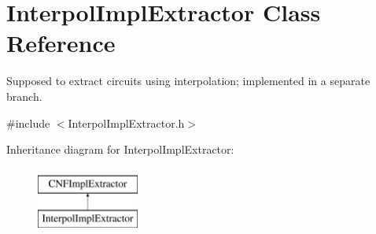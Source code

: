 \hypertarget{classInterpolImplExtractor}{\section{Interpol\-Impl\-Extractor Class Reference}
\label{classInterpolImplExtractor}
}


Supposed to extract circuits using interpolation; implemented in a separate branch.  




{\ttfamily \#include $<$Interpol\-Impl\-Extractor.\-h$>$}

Inheritance diagram for Interpol\-Impl\-Extractor\-:\begin{figure}[H]
\begin{center}
\leavevmode
\includegraphics[height=2.000000cm]{classInterpolImplExtractor}
\end{center}
\end{figure}
